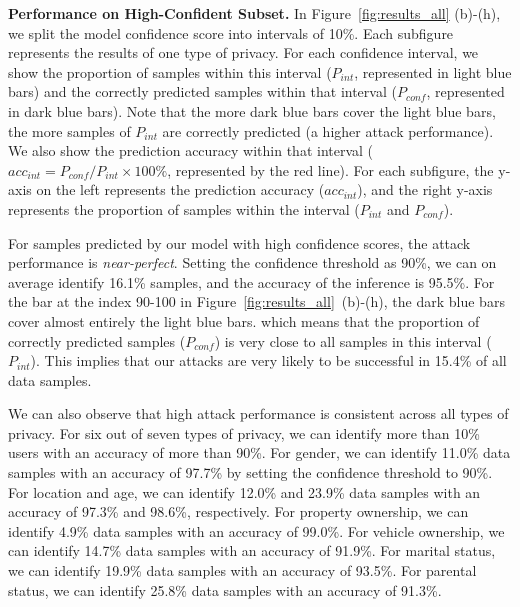 \noindent \textbf{Performance on High-Confident Subset.}
In Figure~\ref{fig:results_all} (b)-(h), we split the model confidence score
into intervals of 10\%. Each subfigure represents the results of one type of
privacy. For each confidence interval, we show the proportion of samples within
this interval ($P_{int}$, represented in light blue bars) and the
correctly predicted samples within that interval ($P_{conf}$, represented in
dark blue bars). Note that the more dark blue bars cover the light blue bars,
the more samples of $P_{int}$ are correctly predicted (a higher
attack performance). We also show the prediction accuracy within that interval
($acc_{int} = P_{conf} / P_{int} \times 100\%$, represented by the red line).
For each subfigure, the y-axis on the left represents the prediction accuracy
($acc_{int}$), and the right y-axis represents the proportion of samples within
the interval ($P_{int}$ and $P_{conf}$). 


For samples predicted by our model with high confidence scores, the
attack performance is \textit{near-perfect}. Setting the confidence
threshold as 90\%, we can on average identify 16.1\% samples, and the accuracy of the inference is 95.5\%. For the bar at the index 90-100 in
Figure~\ref{fig:results_all}~(b)-(h), the dark blue bars cover almost entirely the light blue bars. which means that the proportion of correctly predicted samples
($P_{conf}$) is very close to all samples in this interval ($P_{int}$). This
implies that our attacks are very likely to be successful in 15.4\% of all data
samples. 


We can also observe that high attack performance is consistent across all
types of privacy. For six out of seven types of privacy, we can identify more than 10\% users with an accuracy of more than 90\%. For gender, we can identify
11.0\% data samples with an accuracy of 97.7\% by setting the confidence
threshold to 90\%. For location and age, we can identify 12.0\% and 23.9\% data
samples with an accuracy of 97.3\% and 98.6\%, respectively. For property
ownership, we can identify 4.9\% data samples with an accuracy of 99.0\%. For
vehicle ownership, we can identify 14.7\% data samples with an accuracy of
91.9\%. For marital status, we can identify 19.9\% data samples with an accuracy
of 93.5\%. For parental status, we can identify 25.8\% data samples with an
accuracy of 91.3\%.


